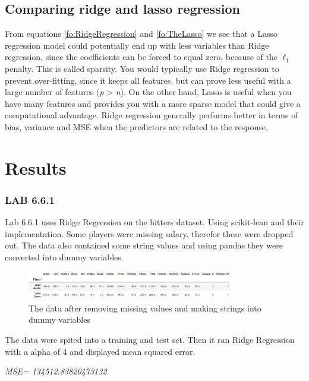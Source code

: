 \subsection{Comparing ridge and lasso regression}

From equations \ref{fo:RidgeRegression} and \ref{fo:TheLasso} we see that a Lasso regression model could potentially end up with less variables than Ridge regression, since the coefficients can be forced to equal zero, because of the $\ell_1$ penalty. This is called sparsity. You would typically use Ridge regression to prevent over-fitting, since it keeps all features, but can prove less useful with a large number of features (\textit{p} > \textit{n}). On the other hand, Lasso is useful when you have many features and provides you with a more sparse model that could give a computational advantage. Ridge regression generally performs better in terms of bias, variance and MSE when the predictors are related to the response. %

\section{Results}
\subsubsection*{LAB 6.6.1}%
Lab 6.6.1 uses Ridge Regression on the hitters dataset. Using scikit-lean and their implementation. Some players were missing salary, therefor these were dropped out. The data also contained some string values and using pandas they were converted  into dummy variables.  
\begin{figure}[H]
	\centering
	\includegraphics[width=0.8\textwidth]{shrinkageMethods/fig/data.png}
	\caption{The data after removing missing values and making strings into dummy variables }
	\label{fig:lab661_data}
\end{figure}
The data were spited into a training and test set. Then it ran Ridge Regression with a alpha of 4 and displayed mean squared error.


\noindent\textit{MSE= 134512.83820473132}

